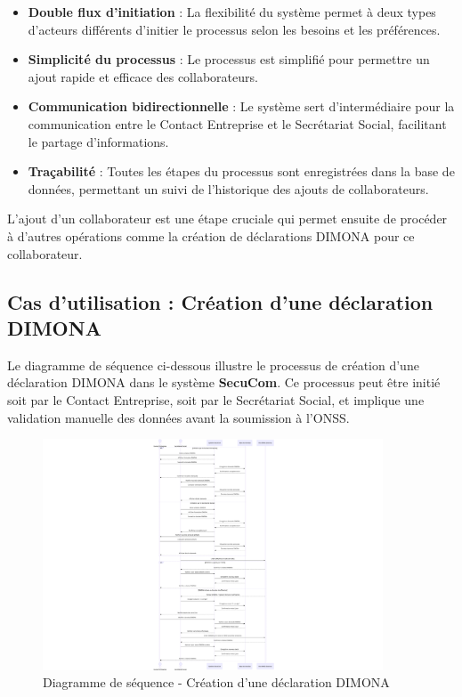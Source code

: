 \begin{itemize}
  \item \textbf{Double flux d'initiation} : La flexibilité du système permet à deux types d'acteurs différents d'initier le processus selon les besoins et les préférences.
  \item \textbf{Simplicité du processus} : Le processus est simplifié pour permettre un ajout rapide et efficace des collaborateurs.
  \item \textbf{Communication bidirectionnelle} : Le système sert d'intermédiaire pour la communication entre le Contact Entreprise et le Secrétariat Social, facilitant le partage d'informations.
  \item \textbf{Traçabilité} : Toutes les étapes du processus sont enregistrées dans la base de données, permettant un suivi de l'historique des ajouts de collaborateurs.
\end{itemize}

L'ajout d'un collaborateur est une étape cruciale qui permet ensuite de procéder à d'autres opérations comme la création de déclarations DIMONA pour ce collaborateur.

\subsection{Cas d'utilisation : Création d'une déclaration DIMONA}

\noindent Le diagramme de séquence ci-dessous illustre le processus de création d'une déclaration DIMONA dans le système \textbf{SecuCom}. Ce processus peut être initié soit par le Contact Entreprise, soit par le Secrétariat Social, et implique une validation manuelle des données avant la soumission à l'ONSS.

\begin{figure}[H]
\centering
\includegraphics[width=0.9\textwidth]{SD_creation_dimona.png}
\caption{Diagramme de séquence - Création d'une déclaration DIMONA}
\end{figure}

